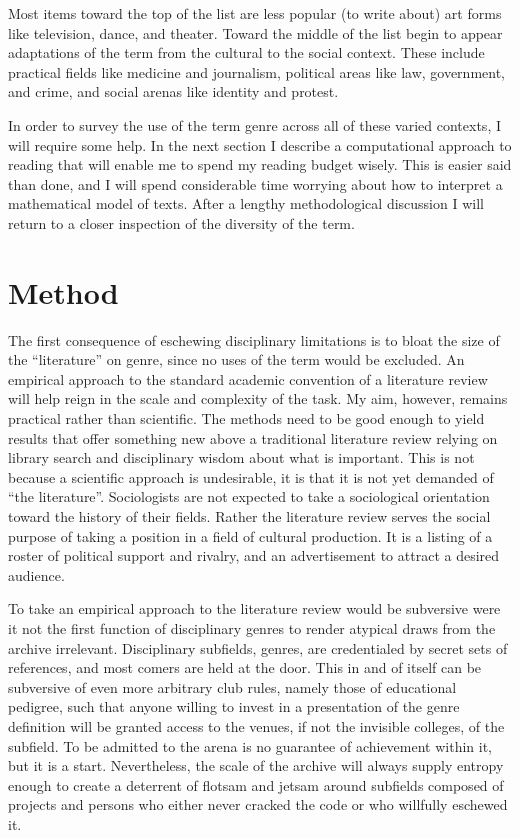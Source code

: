 \documentclass[]{book}
\theoremstyle{definition}
\theoremstyle{definition}
\theoremstyle{definition}
\theoremstyle{remark}
\begin{document}
Most items toward the top of the list are less popular (to write about)
art forms like television, dance, and theater. Toward the middle of the
list begin to appear adaptations of the term from the cultural to the
social context. These include practical fields like medicine and
journalism, political areas like law, government, and crime, and social
arenas like identity and protest.

In order to survey the use of the term genre across all of these varied
contexts, I will require some help. In the next section I describe a
computational approach to reading that will enable me to spend my
reading budget wisely. This is easier said than done, and I will spend
considerable time worrying about how to interpret a mathematical model
of texts. After a lengthy methodological discussion I will return to a
closer inspection of the diversity of the term.

\hypertarget{method}{%
\section{Method}\label{method}}

The first consequence of eschewing disciplinary limitations is to bloat
the size of the ``literature'' on genre, since no uses of the term would
be excluded. An empirical approach to the standard academic convention
of a literature review will help reign in the scale and complexity of
the task. My aim, however, remains practical rather than scientific. The
methods need to be good enough to yield results that offer something new
above a traditional literature review relying on library search and
disciplinary wisdom about what is important. This is not because a
scientific approach is undesirable, it is that it is not yet demanded of
``the literature''. Sociologists are not expected to take a sociological
orientation toward the history of their fields. Rather the literature
review serves the social purpose of taking a position in a field of
cultural production. It is a listing of a roster of political support
and rivalry, and an advertisement to attract a desired audience.

To take an empirical approach to the literature review would be
subversive were it not the first function of disciplinary genres to
render atypical draws from the archive irrelevant. Disciplinary
subfields, genres, are credentialed by secret sets of references, and
most comers are held at the door. This in and of itself can be
subversive of even more arbitrary club rules, namely those of
educational pedigree, such that anyone willing to invest in a
presentation of the genre definition will be granted access to the
venues, if not the invisible colleges, of the subfield. To be admitted
to the arena is no guarantee of achievement within it, but it is a
start. Nevertheless, the scale of the archive will always supply entropy
enough to create a deterrent of flotsam and jetsam around subfields
composed of projects and persons who either never cracked the code or
who willfully eschewed it.
\end{document}
